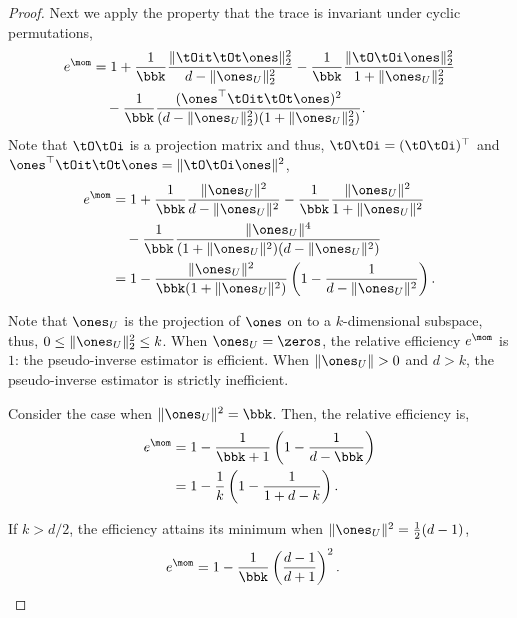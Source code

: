 \begin{proof}
Next we apply the property that the trace is invariant under cyclic
permutations,
\begin{align*}
  e^\mom
    &= 1 + \frac{1}{\bbk}
          \frac{
              \|\tOit \tOt \ones\|_2^2
          }{
            d - \|\ones_U\|_2^2 
          } 
        - \frac{1}{\bbk}
        \frac{\|\tO \tOi \ones\|_2^2}{1+ \|\ones_U\|_2^2} \\
    &\quad
    - \frac{1}{\bbk}
    \frac{(\ones^\top \tOit \tOt \ones)^2}
        {(d - \|\ones_U\|_2^2 ) (1+ \|\ones_U\|_2^2)}.
      \end{align*}
Note that $\tO\tOi$ is a projection matrix and thus, $\tO\tOi
      = (\tO\tOi)^\top$ and $\ones^\top \tOit\tOt \ones = \|\tO\tOi
      \ones\|^2$,
      \begin{align*}
        e^\mom
&= 1
+ \frac{1}{\bbk} \frac{\|\ones_U\|^2}{d - \|\ones_U\|^2}
    -  \frac{1}{\bbk}\frac{\|\ones_U\|^2}{1 + \|\ones_U\|^2}\\
&\quad
    -  \frac{1}{\bbk}\frac{\|\ones_U\|^4}{(1 + \|\ones_U\|^2)(d - \|\ones_U\|^2)} \\
    &= 1 - \frac{\|\ones_U\|^2}{\bbk (1 + \|\ones_U\|^2)} \left( 1 - \frac{1}{d - \|\ones_U\|^2} \right).
\end{align*}

Note that $\ones_U$ is the projection of $\ones$ on to a $k$-dimensional
subspace, thus, $0 \le \|\ones_U\|^2_2 \le k$.
When $\ones_U = \zeros$, the relative efficiency $e^\mom$ is $1$: the pseudo-inverse estimator is efficient. When $\|\ones_U\| > 0$ and $d > k$, the pseudo-inverse estimator is strictly inefficient.

Consider the case when $\|\ones_U\|^2 = \bbk$. Then, the relative efficiency
is,
\begin{align*}
  e^\mom 
    &= 1 - \frac{1}{\bbk +1} \left(1 - \frac{1}{d - \bbk} \right) \\
    &= 1 - \frac{1}{k} \left(1 - \frac{1}{1 + d - k} \right).
\end{align*}

If $k > d/2$, the efficiency attains its minimum when $\|\ones_U\|^2
= \frac{1}{2} (d-1)$, 
\begin{align*}
  e^\mom 
  &= 1 - \frac{1}{\bbk}\left(\frac{d-1}{d+1}\right)^2.
\end{align*}
\end{proof}


